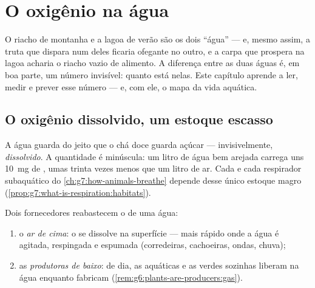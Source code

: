 \chapter{O oxigênio na água}\label{ch:g7:oxygen-in-the-water}

O riacho de montanha e a lagoa de verão são os dois ``água'' --- e,
mesmo assim, a truta que dispara num deles ficaria ofegante no outro,
e a carpa que prospera na lagoa acharia o riacho vazio de alimento. A
diferença entre as duas águas é, em boa parte, um número invisível:
quanto  está  nelas. Este capítulo aprende a ler,
medir e prever esse número --- e, com ele, o mapa da vida aquática.

\section{O oxigênio dissolvido, um estoque escasso}

\begin{definition}\label{def:g7:oxygen-in-the-water:dissolved}
A água guarda  do jeito que o chá doce guarda açúcar ---
invisivelmente, \emph{dissolvido}. A
quantidade é minúscula: um litro de água bem arejada carrega uns
\qty{10}{mg} de , umas trinta vezes menos que um litro de ar.
Cada  e cada respirador subaquático do
\cref{ch:g7:how-animals-breathe} depende desse único estoque magro
(\cref{prop:g7:what-is-respiration:habitats}).
\end{definition}

\begin{proposition}\label{prop:g7:oxygen-in-the-water:fills}
Dois fornecedores reabastecem o  de uma água:
\begin{enumerate}
  \item o \emph{ar de cima}: o  se dissolve na superfície ---
        mais rápido onde a água é agitada, respingada e espumada
        (corredeiras, cachoeiras, ondas, chuva);
  \item as \emph{produtoras de baixo}: de dia, as  aquáticas e
        as  verdes sozinhas liberam  na água enquanto
        fabricam (\cref{rem:g6:plants-are-producers:gas}).
\end{enumerate}
\end{proposition}
\admitted


